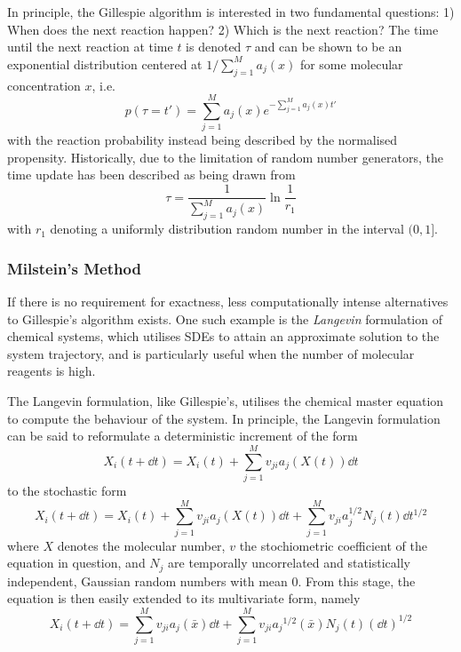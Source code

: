 In principle, the Gillespie algorithm is interested in two fundamental
questions: 1) When does the next reaction happen? 2) Which is the next reaction?
The time until the next reaction at time $t$ is denoted $\tau$ and can be shown
to be an exponential distribution centered  
at $1 / \sum_{j=1}^{M}a_j(x)$ for some molecular concentration $x$, i.e.
\begin{equation}
  p(\tau = t') = \sum_{j=1}^M a_j(x)e^{-\sum_{j=1}^M a_j(x)t'}
  \label{eq:gill:time}
\end{equation}
with the reaction probability instead being described by the normalised
propensity. Historically, due to the limitation of random number generators, the
time update has been described as being drawn from 
\begin{equation} 
  \displaystyle
  \tau = \dfrac{1}{\sum_{j=1}^M a_j(x)} \ln\dfrac{1}{r_1}
  \label{eq:gill_time_update}
\end{equation}
with $r_1$ denoting a uniformly distribution random number in the interval
$(0,1]$.

\subsubsection{Milstein's Method}
If there is no requirement for exactness, less computationally intense
alternatives to Gillespie's algorithm exists. One such example is the
\textit{Langevin} formulation of chemical systems, which utilises SDEs to
attain an approximate solution to the system trajectory, and is particularly
useful when the number of molecular reagents is high. 

The Langevin formulation, like Gillespie's, utilises the chemical master
equation to compute the behaviour of the system. In principle, the Langevin
formulation can be said to reformulate a deterministic increment of the form
\begin{equation}
  X_i(t + \dd{t}) = X_{i}(t) + \sum_{j=1}^M
  v_{ji}a_j(X(t))\dd{t}
  \label{eq:deterministic}
\end{equation}
to the stochastic form
\begin{equation}
  X_i(t + \dd{t}) = X_{i}(t) + \sum_{j=1}^M
  v_{ji}a_j(X(t))\dd{t} + \sum_{j=1}^M
  v_{ji}a_j^{1/2}N_j(t)\dd{t}^{1/2}
  \label{eq:stoch}
\end{equation}
where $X$ denotes the molecular number, $v$ the stochiometric coefficient of the
equation in question, and $N_j$ are temporally uncorrelated and statistically
independent, Gaussian random numbers with mean 0. From this stage, the equation
is then easily extended to its multivariate form, namely
\begin{equation}
  X_i(t + \dd{t}) = \sum_{j=1}^Mv_{ji}a_j(\bar x) \dd{t} +
  \sum_{j=1}^M v_{ji}{a_j}^{1/2}(\bar x) N_j(t) \left( \dd t \right)^{1/2}
  \label{eq:stoch_multi}
\end{equation}

